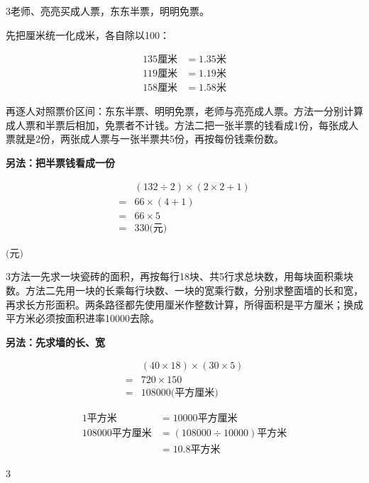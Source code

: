 \documentclass[multi=snippet,border={5bp 20bp 5bp 5bp}]{standalone}
\newenvironment{snippet}[3]{\begin{minipage}{#1bp}\color{answerred}\fontsize{#2}{#3}\selectfont\raggedright}{\end{minipage}}
\begin{document}
\begin{snippet}{505}{11.5}{14}\begin{multicols}{3}\raggedcolumns 老师、亮亮买成人票，东东半票，明明免票。\par 先把厘米统一化成米，各自除以100：\par\noindent\[\displaystyle \begin{aligned}135\text{厘米}&=1.35\text{米}\\119\text{厘米}&=1.19\text{米}\\158\text{厘米}&=1.58\text{米}\end{aligned}\]\par 再逐人对照票价区间：东东半票、明明免票，老师与亮亮成人票。方法一分别计算成人票和半票后相加，免票者不计钱。方法二把一张半票的钱看成1份，每张成人票就是2份，两张成人票与一张半票共5份，再按每份钱乘份数。\par \textbf{另法：把半票钱看成一份}\par \noindent\[\displaystyle \begin{aligned}&(132\div2)\times(2\times2+1)\\={}&66\times(4+1)\\={}&66\times5\\={}&330\text{(元)}\end{aligned}\]\par\end{multicols}\end{snippet}
\begin{snippet}{80}{9.0}{14}\SourceSans\setlength{\mathindent}{2bp}\(\text{(元)}\)\end{snippet}
\begin{snippet}{505}{11.5}{14}\begin{multicols}{3}\raggedcolumns 方法一先求一块瓷砖的面积，再按每行18块、共5行求总块数，用每块面积乘块数。方法二先用一块的长乘每行块数、一块的宽乘行数，分别求整面墙的长和宽，再求长方形面积。两条路径都先使用厘米作整数计算，所得面积是平方厘米；换成平方米必须按面积进率10000去除。\par \textbf{另法：先求墙的长、宽}\par\noindent\[\displaystyle \begin{aligned}&(40\times18)\times(30\times5)\\={}&720\times150\\={}&108000\text{(平方厘米)}\end{aligned}\]\par \noindent\end{multicols}\[\displaystyle \begin{aligned}1\text{平方米}&=10000\text{平方厘米}\\108000\text{平方厘米}&=(108000\div10000)\text{平方米}\\&=10.8\text{平方米}\end{aligned}\]\begin{multicols}{3}\raggedcolumns \par\end{multicols}\end{snippet}
\end{document}

